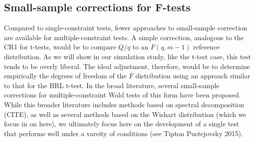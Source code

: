 \documentclass[12pt]{article}
\newcommand{\bm}{\mathbf}
\newcommand{\bs}{\boldsymbol}
\begin{document}


\subsection{Small-sample corrections for F-tests}



Compared to single-constraint tests, fewer approaches to small-sample correction are available for multiple-constraint tests. 
A simple correction, analogous to the CR1 for t-tests, would be to compare $Q / q$ to an $F(q, m - 1)$ reference distribution. 
As we will show in our simulation study, like the t-test case, this test tends to be overly liberal. 
The ideal adjustment, therefore, would be to determine empirically the degrees of freedom of the $F$ distribution using an approach similar to that for the BRL t-test. In the broad literature, several small-sample corrections for multiple-constraint Wald tests of this form have been proposed. 
While this broader literature includes methods based on spectral decomposition (CITE), as well as several methods based on the Wishart distribution (which we focus in on here), we ultimately focus here on the development of a single test that performs well under a vareity of conditions (see Tipton Pustejovsky 2015). 
\end{document}
